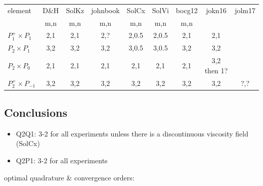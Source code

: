 \begin{scriptsize}
\begin{center}
\begin{tabular}{|l|c|c|c|c|c|c|c|c|}
\hline
element          & D\&H & SolKz  &  johnbook  & SolCx &  SolVi & bocg12&jokn16 &jolm17  \\
                      & m,n& m,n& m,n& m,n & m,n& m,n \\
\hline
$P_1^+\times P_{1}$   &  2,1 & 2,1 &  2,? &  2,0.5 & 2,0.5 &2,1 & 2,1  \\
$P_2\times P_1$       &  
{\color{teal} 3,2} & 
{\color{teal} 3,2} &  
{\color{teal} 3,2} &  
3,0.5 & 
3,0.5 &
{\color{teal} 3,2} & 
{\color{teal} 3,2}   \\
$P_2\times P_0$       &  2,1 & 2,1 &  2,1 &  2,1   & 2,1   &2,1 & 3,2 then 1?  \\
$P_2^+\times P_{-1}$  &  
{\color{teal} 3,2} & 
{\color{teal} 3,2} & 
{\color{teal} 3,2} & 
{\color{teal} 3,2} & 
{\color{teal} 3,2} & 
{\color{teal} 3,2} & 
{\color{teal} 3,2} &
?,?\\
\hline
\end{tabular}
\end{center}
\end{scriptsize}

\subsection*{Conclusions}

\begin{itemize}
\item Q2Q1: 3-2 for all experiments unless there is a discontinuous viscosity field (SolCx)
\item Q2P1: 3-2 for all experiments
\end{itemize}








\newpage
optimal quadrature \& convergence orders:

